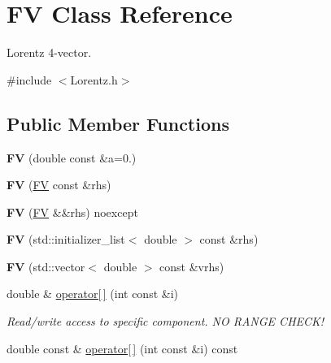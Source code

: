 \hypertarget{classFV}{}\section{F\+V Class Reference}
\label{classFV}


Lorentz 4-\/vector.  




{\ttfamily \#include $<$Lorentz.\+h$>$}

\subsection*{Public Member Functions}
\begin{DoxyCompactItemize}
\item 
\hypertarget{classFV_a9b4fbb099348e0f5658290d99fcfde0f}{}{\bfseries F\+V} (double const \&a=0.)\label{classFV_a9b4fbb099348e0f5658290d99fcfde0f}

\item 
\hypertarget{classFV_a7806dbe1498cda6e7b5e9deb0772915d}{}{\bfseries F\+V} (\hyperlink{classFV}{F\+V} const \&rhs)\label{classFV_a7806dbe1498cda6e7b5e9deb0772915d}

\item 
\hypertarget{classFV_a64d4ea0c4b74dd2fd557c72c30987aa5}{}{\bfseries F\+V} (\hyperlink{classFV}{F\+V} \&\&rhs) noexcept\label{classFV_a64d4ea0c4b74dd2fd557c72c30987aa5}

\item 
\hypertarget{classFV_af72b920827e214354d0a674187e893a3}{}{\bfseries F\+V} (std\+::initializer\+\_\+list$<$ double $>$ const \&rhs)\label{classFV_af72b920827e214354d0a674187e893a3}

\item 
\hypertarget{classFV_aef94cf9268c7b20a2c9365cc28315581}{}{\bfseries F\+V} (std\+::vector$<$ double $>$ const \&vrhs)\label{classFV_aef94cf9268c7b20a2c9365cc28315581}

\item 
\hypertarget{classFV_addb4bbcc8d3ba7d8e94c1b6fdd006acd}{}double \& \hyperlink{classFV_addb4bbcc8d3ba7d8e94c1b6fdd006acd}{operator\mbox{[}$\,$\mbox{]}} (int const \&i)\label{classFV_addb4bbcc8d3ba7d8e94c1b6fdd006acd}

\begin{DoxyCompactList}\small\item\em Read/write access to specific component. N\+O R\+A\+N\+G\+E C\+H\+E\+C\+K! \end{DoxyCompactList}\item 
\hypertarget{classFV_a8c340629f03c5f4d96aefd119dd43d6e}{}double const \& \hyperlink{classFV_a8c340629f03c5f4d96aefd119dd43d6e}{operator\mbox{[}$\,$\mbox{]}} (int const \&i) const \label{classFV_a8c340629f03c5f4d96aefd119dd43d6e}


\end{DoxyCompactItemize}
